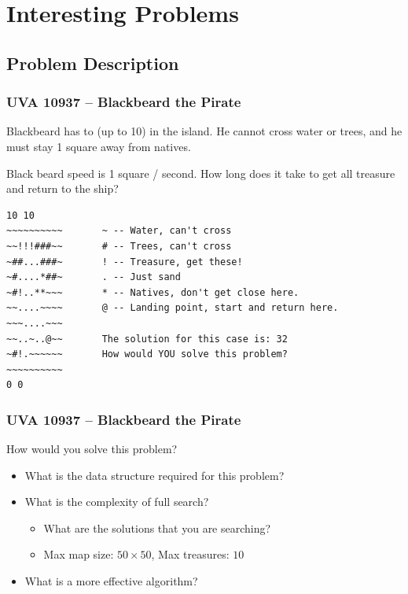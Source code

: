 
\section{Interesting Problems}
\subsection{Problem Description}


\begin{frame}[fragile]
  \frametitle{UVA 10937 -- Blackbeard the Pirate}

  {\smaller

    \begin{block}{}
      Blackbeard has to  (up to 10)
      in the island. He \alert{cannot cross} water or trees, and he
      must stay 1 square away from natives.

      \medskip

      Black beard speed is 1 square / second. How long does it take
      to get all treasure and return to the ship?
    \end{block}

\begin{verbatim}
10 10
~~~~~~~~~~       ~ -- Water, can't cross
~~!!!###~~       # -- Trees, can't cross
~##...###~       ! -- Treasure, get these!
~#....*##~       . -- Just sand
~#!..**~~~       * -- Natives, don't get close here.
~~....~~~~       @ -- Landing point, start and return here.
~~~....~~~
~~..~..@~~       The solution for this case is: 32
~#!.~~~~~~       How would YOU solve this problem?
~~~~~~~~~~
0 0
\end{verbatim}
}
\end{frame}

\begin{frame}
  \frametitle{UVA 10937 -- Blackbeard the Pirate}

  How would you solve this problem?\bigskip

  \begin{itemize}
    \item What is the data structure required for this problem?\bigskip

    \item What is the complexity of full search?\bigskip
    \begin{itemize}
      \item What are the solutions that you are searching?
      \item Max map size: $50\times50$, Max treasures: $10$
    \end{itemize}

    \item What is a more effective algorithm?
  \end{itemize}

\end{frame}

